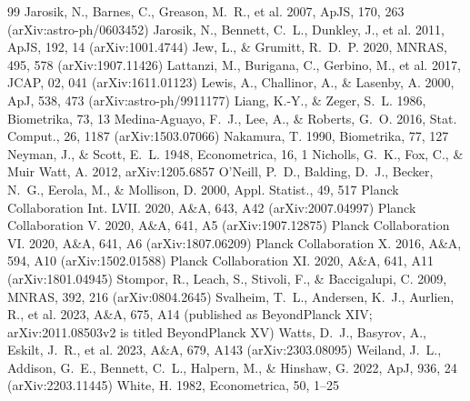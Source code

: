 \begin{thebibliography}{99}
 Jarosik, N., Barnes, C., Greason, M.~R., et al. 2007, ApJS, 170, 263 (arXiv:astro-ph/0603452)
 Jarosik, N., Bennett, C.~L., Dunkley, J., et al. 2011, ApJS, 192, 14 (arXiv:1001.4744)
 Jew, L., \& Grumitt, R.~D.~P. 2020, MNRAS, 495, 578 (arXiv:1907.11426)
 Lattanzi, M., Burigana, C., Gerbino, M., et al. 2017, JCAP, 02, 041 (arXiv:1611.01123)
 Lewis, A., Challinor, A., \& Lasenby, A. 2000, ApJ, 538, 473 (arXiv:astro-ph/9911177)
 Liang, K.-Y., \& Zeger, S.~L. 1986, Biometrika, 73, 13
 Medina-Aguayo, F.~J., Lee, A., \& Roberts, G.~O. 2016, Stat. Comput., 26, 1187 (arXiv:1503.07066)
 Nakamura, T. 1990, Biometrika, 77, 127
 Neyman, J., \& Scott, E.~L. 1948, Econometrica, 16, 1
 Nicholls, G.~K., Fox, C., \& Muir Watt, A. 2012, arXiv:1205.6857
 O'Neill, P.~D., Balding, D.~J., Becker, N.~G., Eerola, M., \& Mollison, D. 2000, Appl. Statist., 49, 517
 Planck Collaboration Int. LVII. 2020, A\&A, 643, A42 (arXiv:2007.04997)
 Planck Collaboration V. 2020, A\&A, 641, A5 (arXiv:1907.12875)
 Planck Collaboration VI. 2020, A\&A, 641, A6 (arXiv:1807.06209)
 Planck Collaboration X. 2016, A\&A, 594, A10 (arXiv:1502.01588)
 Planck Collaboration XI. 2020, A\&A, 641, A11 (arXiv:1801.04945)
 Stompor, R., Leach, S., Stivoli, F., \& Baccigalupi, C. 2009, MNRAS, 392, 216 (arXiv:0804.2645)
 Svalheim, T.~L., Andersen, K.~J., Aurlien, R., et al. 2023, A\&A, 675, A14 (published as BeyondPlanck XIV; arXiv:2011.08503v2 is titled BeyondPlanck XV)
 Watts, D.~J., Basyrov, A., Eskilt, J.~R., et al. 2023, A\&A, 679, A143 (arXiv:2303.08095)
 Weiland, J.~L., Addison, G.~E., Bennett, C.~L., Halpern, M., \& Hinshaw, G. 2022, ApJ, 936, 24 (arXiv:2203.11445)
 White, H. 1982, Econometrica, 50, 1--25
\end{thebibliography}
